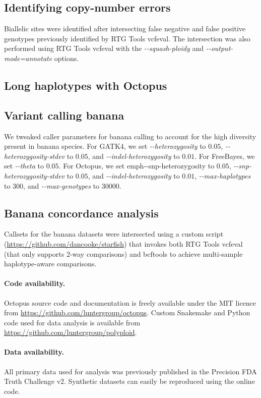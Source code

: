 \documentclass[notitlepage, twocolumn, 10pt]{article}
\begin{document}
\subsection*{Identifying copy-number errors} Biallelic sites were identified after intersecting false negative and false positive genotypes previously identified by RTG Tools vcfeval. The intersection was also performed using RTG Tools vcfeval with the \emph{-{}-squash-ploidy} and \emph{-{}-output-mode=annotate} options. 

\subsection*{Long haplotypes with Octopus} 

\subsection*{Variant calling banana} We tweaked caller parameters for banana calling to account for the high diversity present in banana species. For GATK4, we set \emph{-{}-heterozygosity} to $0.05$, \emph{-{}-heterozygosity-stdev} to $0.05$, and \emph{-{}-indel-heterozygosity} to $0.01$. For FreeBayes, we set \emph{-{}-theta} to $0.05$. For Octopus, we set emph{-{}-snp-heterozygosity} to $0.05$, \emph{-{}-snp-heterozygosity-stdev} to $0.05$, and \emph{-{}-indel-heterozygosity} to $0.01$, \emph{-{}-max-haplotypes} to $300$, and \emph{-{}-max-genotypes} to $30000$.

\subsection*{Banana concordance analysis} Callsets for the banana datasets were intersected using a custom script (\url{https://github.com/dancooke/starfish}) that invokes both RTG Tools vcfeval (that only supports 2-way comparisons) and bcftools to achieve multi-sample haplotype-aware comparisons.

\paragraph*{Code availability.} Octopus source code and documentation is freely available under the MIT licence from \url{https://github.com/luntergroup/octopus}. Custom Snakemake and Python code used for data analysis is available from \url{https://github.com/luntergroup/polyploid}.

\paragraph*{Data availability.} All primary data used for analysis was previously published in the Precision FDA Truth Challenge v2\cite{RN809}. Synthetic datasets can easily be reproduced using the online code.
\end{document}
